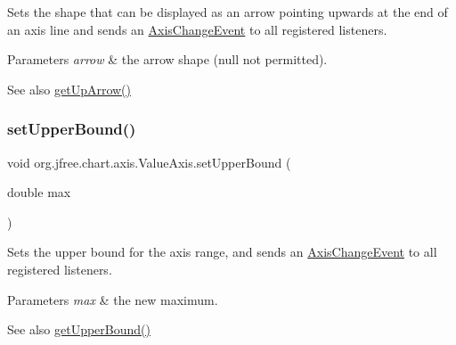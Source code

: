 Sets the shape that can be displayed as an arrow pointing upwards at the end of an axis line and sends an \mbox{\hyperlink{}{Axis\+Change\+Event}} to all registered listeners.


\begin{DoxyParams}{Parameters}
{\em arrow} & the arrow shape ({\ttfamily null} not permitted).\\
\hline
\end{DoxyParams}
\begin{DoxySeeAlso}{See also}
\mbox{\hyperlink{classorg_1_1jfree_1_1chart_1_1axis_1_1_value_axis_adfbdda5b0016c6d1f8d238979f3ab1a1}{get\+Up\+Arrow()}} 
\end{DoxySeeAlso}
\mbox{\label{classorg_1_1jfree_1_1chart_1_1axis_1_1_value_axis_ab2872c6051cab2e55611cd85ef3baabb}} 
\subsubsection{\texorpdfstring{set\+Upper\+Bound()}{setUpperBound()}}
{\footnotesize\ttfamily void org.\+jfree.\+chart.\+axis.\+Value\+Axis.\+set\+Upper\+Bound (\begin{DoxyParamCaption}\item[{double}]{max }\end{DoxyParamCaption})}

Sets the upper bound for the axis range, and sends an \mbox{\hyperlink{}{Axis\+Change\+Event}} to all registered listeners.


\begin{DoxyParams}{Parameters}
{\em max} & the new maximum.\\
\hline
\end{DoxyParams}
\begin{DoxySeeAlso}{See also}
\mbox{\hyperlink{classorg_1_1jfree_1_1chart_1_1axis_1_1_value_axis_a392f4637b486698032128b77a85cbf3e}{get\+Upper\+Bound()}} 
\end{DoxySeeAlso}
\mbox{\label{classorg_1_1jfree_1_1chart_1_1axis_1_1_value_axis_a6ba839a843d27cf2f79a10a20dd98650}} 

